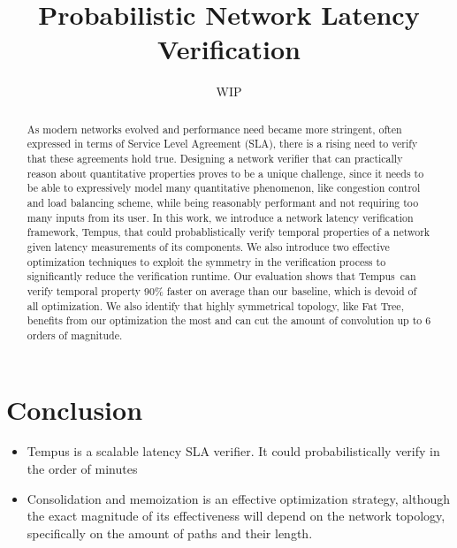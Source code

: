 \documentclass[10pt,sigconf,letterpaper,anonymous,nonacm]{acmart}
\title{Probabilistic Network Latency Verification}
\author{WIP}
\newcommand{\tool}[0]{Tempus}
\begin{document}
\begin{abstract}
    As modern networks evolved and performance need became more stringent, often 
    expressed in terms of Service Level Agreement (SLA), there is a rising need to verify that these 
    agreements hold true.
    Designing a network verifier that can practically reason about quantitative properties proves to be 
    a unique challenge, since it needs to be able to expressively model many quantitative phenomenon, like 
    congestion control and load balancing scheme, while being reasonably performant and not 
    requiring too many inputs from its user. 
    In this work, we introduce a network latency verification framework, \tool, that could probablistically 
    verify temporal properties of a network given latency measurements of its components. 
    We also introduce two effective optimization techniques to exploit the symmetry in the verification 
    process to significantly reduce the verification runtime.
    Our evaluation shows that \tool\ can verify temporal property 90\% faster on average than 
    our baseline, which is devoid of all optimization.
    We also identify that highly symmetrical topology, like Fat Tree, benefits from our optimization the most 
    and can cut the amount of convolution up to 6 orders of magnitude.
\end{abstract}

\maketitle



















\section{Conclusion} \label{sec:conc}
\begin{itemize}
    \item Tempus is a scalable latency SLA verifier. It could probabilistically verify in the order of minutes
    \item Consolidation and memoization is an effective optimization strategy, although the exact magnitude of 
        its effectiveness will depend on the network topology, specifically on the amount of paths and their 
        length.
\end{itemize}



\end{document}
